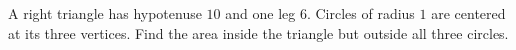 A right triangle has hypotenuse $10$ and one leg $6$. Circles of radius $1$ are centered at its three vertices. Find the area inside the triangle but outside all three circles.
